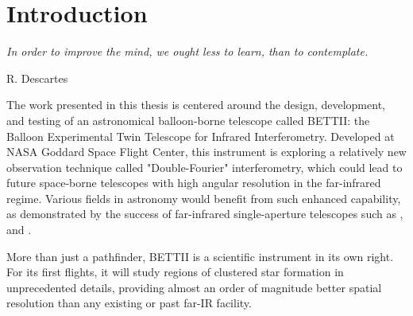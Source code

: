 \chapter*{Introduction}
\label{chap:introduction}


\epigraph{\small\itshape In order to improve the mind, we ought less to learn, than to contemplate.}{R. Descartes}


The work presented in this thesis is centered around the design, development, and testing of an astronomical balloon-borne telescope called BETTII: the Balloon Experimental Twin Telescope for Infrared Interferometry. Developed at NASA Goddard Space Flight Center, this instrument is exploring a relatively new observation technique called "Double-Fourier" interferometry, which could lead to future space-borne telescopes with high angular resolution in the far-infrared regime. Various fields in astronomy would benefit from such enhanced capability, as demonstrated by the success of far-infrared single-aperture telescopes such as \WISE, \Spitzer and \Herschel. 

More than just a pathfinder, BETTII is a scientific instrument in its own right. For its first flights, it will study regions of clustered star formation in unprecedented details, providing almost an order of magnitude better spatial resolution than any existing or past far-IR facility.

